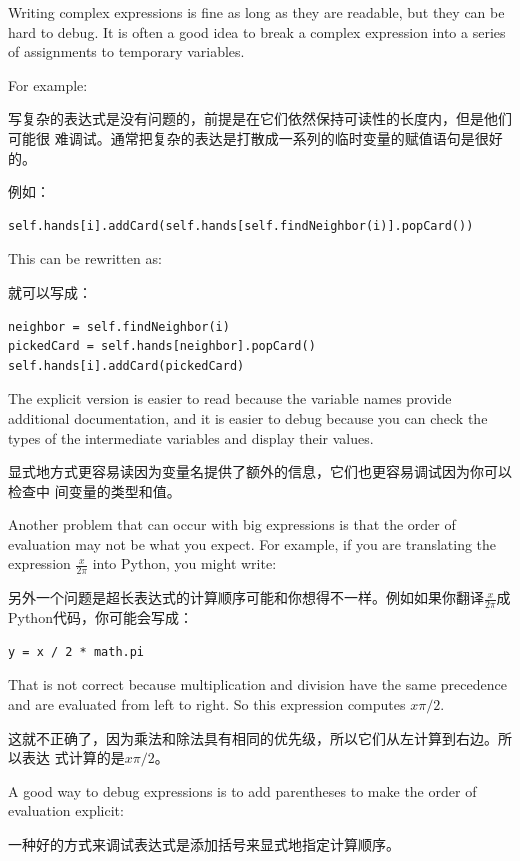 \documentclass[10pt]{book}
\begin{document}
\begin{CJK}{UTF8}{gbsn}
Writing complex expressions is fine as long as they are readable,
but they can be hard to debug.  It is often a good idea to
break a complex expression into a series of assignments to
temporary variables.

For example:

写复杂的表达式是没有问题的，前提是在它们依然保持可读性的长度内，但是他们可能很
难调试。通常把复杂的表达是打散成一系列的临时变量的赋值语句是很好的。

例如：

\begin{verbatim}
self.hands[i].addCard(self.hands[self.findNeighbor(i)].popCard())
\end{verbatim}
%
This can be rewritten as:

就可以写成：

\begin{verbatim}
neighbor = self.findNeighbor(i)
pickedCard = self.hands[neighbor].popCard()
self.hands[i].addCard(pickedCard)
\end{verbatim}
%
The explicit version is easier to read because the variable
names provide additional documentation, and it is easier to debug
because you can check the types of the intermediate variables
and display their values.

显式地方式更容易读因为变量名提供了额外的信息，它们也更容易调试因为你可以检查中
间变量的类型和值。

Another problem that can occur with big expressions is
that the order of evaluation may not be what you expect.
For example, if you are translating the expression
$\frac{x}{2 \pi}$ into Python, you might write:

另外一个问题是超长表达式的计算顺序可能和你想得不一样。例如如果你翻译$\frac{x}{2
\pi}$成Python代码，你可能会写成：

\begin{verbatim}
y = x / 2 * math.pi
\end{verbatim}
%
That is not correct because multiplication and division have
the same precedence and are evaluated from left to right.
So this expression computes $x \pi / 2$.

这就不正确了，因为乘法和除法具有相同的优先级，所以它们从左计算到右边。所以表达
式计算的是$x \pi / 2$。

A good way to debug expressions is to add parentheses to make
the order of evaluation explicit:

一种好的方式来调试表达式是添加括号来显式地指定计算顺序。


\end{CJK}
\end{document}
